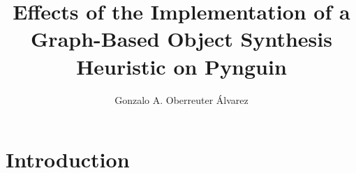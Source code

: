 \documentclass[%
  chapterprefix=false,%
  open=right,%
  twoside=true,%
  paper=a4,%
  logofile={Figures/logo.png},%
  thesistype=master,%
  UKenglish,%
]{se2thesis}
\author{Gonzalo A. Oberreuter Álvarez}
\title{Effects of the Implementation of a Graph-Based Object Synthesis Heuristic on Pynguin}
\institute{Chair of Software Engineering}
\begin{document}
\frontmatter

\maketitle

\mainmatter{}

\chapter{Introduction}\label{chap:introduction}
\end{document}
